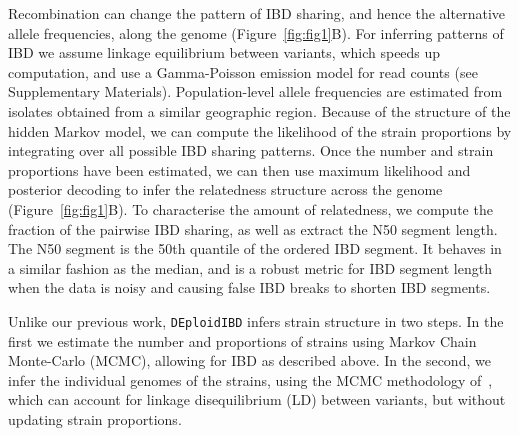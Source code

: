 \documentclass[9pt,lineno]{elife}
\begin{document}
Recombination can change the pattern of IBD sharing, and hence the alternative allele frequencies, along the genome (Figure~\ref{fig:fig1}B).  For inferring patterns of IBD we assume linkage equilibrium between variants, which speeds up computation, and use a Gamma-Poisson emission model for read counts (see Supplementary Materials).  Population-level allele frequencies are estimated from isolates obtained from a similar geographic region.  Because of the structure of the hidden Markov model, we can compute the likelihood of the strain proportions by integrating over all possible IBD sharing patterns.  Once the number and strain proportions have been estimated, we can then use maximum likelihood and posterior decoding to infer the relatedness structure across the genome (Figure~\ref{fig:fig1}B). To characterise the amount of relatedness, we compute the fraction of the pairwise IBD sharing, as well as extract the N50 segment length. The N50 segment is the 50th quantile of the ordered IBD segment. It behaves in a similar fashion as the median, and is a robust metric for IBD segment length when the data is noisy and causing false IBD breaks to shorten IBD segments.

Unlike our previous work, \texttt{DEploidIBD} infers strain structure in two steps.  In the first we estimate the number and proportions of strains using Markov Chain Monte-Carlo (MCMC), allowing for IBD as described above.  In the second, we infer the individual genomes of the strains, using the MCMC methodology of~\citet{Zhu2017}, which can account for linkage disequilibrium (LD) between variants, but without updating strain proportions.
\end{document}
